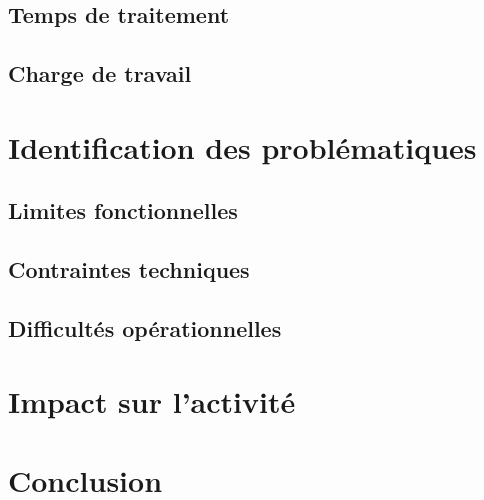 \subsection{Temps de traitement}

\subsection{Charge de travail}

\section{Identification des problématiques}

\subsection{Limites fonctionnelles}

\subsection{Contraintes techniques}

\subsection{Difficultés opérationnelles}

\section{Impact sur l'activité}

\section{Conclusion}